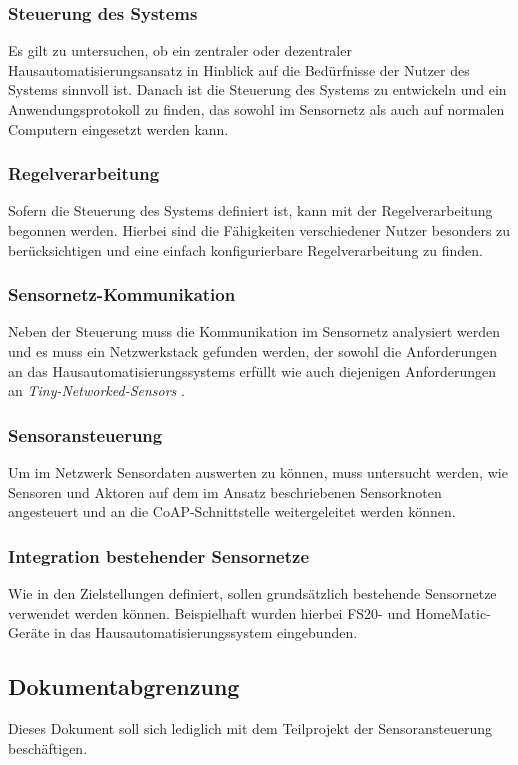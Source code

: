 	\subsubsection{Steuerung des Systems}
		Es gilt zu untersuchen, ob ein zentraler oder dezentraler
		Hausautomatisierungsansatz in Hinblick auf die Bedürfnisse
		der Nutzer des Systems sinnvoll ist. Danach ist
		die Steuerung des Systems zu entwickeln
		und ein Anwendungsprotokoll zu finden, das sowohl im Sensornetz
		als auch auf normalen Computern eingesetzt werden kann.
	\subsubsection{Regelverarbeitung}
		Sofern die Steuerung des Systems definiert ist, kann
		mit der Regelverarbeitung begonnen werden.
		Hierbei sind die Fähigkeiten verschiedener Nutzer
		besonders zu berücksichtigen und eine einfach konfigurierbare
		Regelverarbeitung zu finden.
	\subsubsection{Sensornetz-Kommunikation}
		Neben der Steuerung muss die Kommunikation im Sensornetz
		analysiert werden und es muss ein Netzwerkstack gefunden
		werden, der sowohl die Anforderungen an das
		Hausautomatisierungssystems erfüllt
		wie auch diejenigen Anforderungen an
		\emph{Tiny-Networked-Sensors} \autocite{dunkels04contiki}.
	\subsubsection{Sensoransteuerung}
		\label{sec:teilprojekt}
		Um im Netzwerk Sensordaten auswerten zu können, muss untersucht
		werden, wie Sensoren und Aktoren auf dem im Ansatz beschriebenen
		Sensorknoten angesteuert und an die CoAP-Schnittstelle
		weitergeleitet werden können.
	\subsubsection{Integration bestehender Sensornetze}
		Wie in den Zielstellungen definiert, sollen grundsätzlich
		bestehende Sensornetze verwendet werden können.
		Beispielhaft wurden hierbei FS20- und HomeMatic-Geräte in das
		Hausautomatisierungssystem eingebunden.

\subsection{Dokumentabgrenzung}
	Dieses Dokument soll sich lediglich mit dem Teilprojekt der
	Sensoransteuerung beschäftigen.
	
